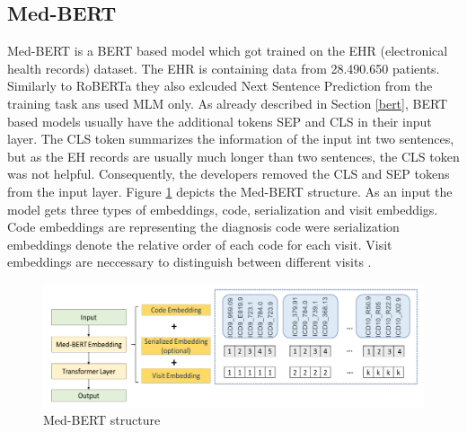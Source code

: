 \subsection{Med-BERT}
Med-BERT is a BERT based model which got trained on the EHR (electronical health records) dataset. The EHR is containing data from 28.490.650 patients. Similarly to RoBERTa they also exlcuded Next Sentence Prediction from the training task ans used MLM only. As already described in Section \ref{bert}, BERT based models usually have the additional tokens SEP and CLS in their input layer. The CLS token summarizes the information of the input int two sentences, but as the EH records are usually much longer than two sentences, the CLS token was not helpful. Consequently, the developers removed the CLS and SEP tokens from the input layer. \newline
Figure \ref{fig:medbert} depicts the Med-BERT structure. As an input the model gets three types of embeddings, code, serialization and visit embeddigs. Code embeddings are representing the diagnosis code were serialization embeddings denote the relative order of each code for each visit. Visit embeddings are neccessary to distinguish between different visits \cite{Rasmi}.

\begin{figure}[H]
	\centering
	\includegraphics[width=1\textwidth]{figures/medbert.PNG}
	\caption{Med-BERT structure}
	\label{fig:medbert}
\end{figure}


